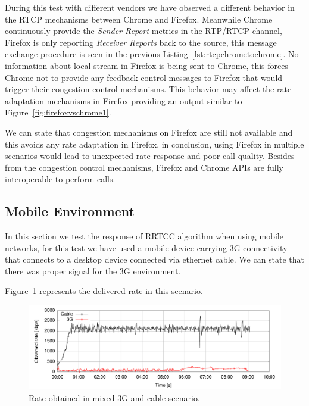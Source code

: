 During this test with different vendors we have observed a different behavior in the RTCP mechanisms between Chrome and Firefox. Meanwhile Chrome continuously provide the {\it Sender Report} metrics in the RTP/RTCP channel, Firefox is only reporting {\it Receiver Reports} back to the source, this message exchange procedure is seen in the previous Listing~\ref{lst:rtcpchrometochrome}. No information about local stream in Firefox is being sent to Chrome, this forces Chrome not to provide any feedback control messages to Firefox that would trigger their congestion control mechanisms. This behavior may affect the rate adaptation mechanisms in Firefox providing an output similar to Figure~\ref{fig:firefoxvschrome1}.

We can state that congestion mechanisms on Firefox are still not available and this avoids any rate adaptation in Firefox, in conclusion, using Firefox in multiple scenarios would lead to unexpected rate response and poor call quality. Besides from the congestion control mechanisms, Firefox and Chrome APIs are fully interoperable to perform calls. 

\subsection{Mobile Environment}

In this section we test the response of RRTCC algorithm when using mobile networks, for this test we have used a mobile device carrying 3G connectivity that connects to a desktop device connected via ethernet cable. We can state that there was proper signal for the 3G environment.

Figure~\ref{fig:3gcable} represents the delivered rate in this scenario. 

\begin{figure}[h]
  \centering
    \includegraphics[width=1\textwidth]{./figures/3gcable.pdf}
      \caption[Rate obtained in mixed 3G and cable scenario]{Rate obtained in mixed 3G and cable scenario.}
	\label{fig:3gcable}
\end{figure}

